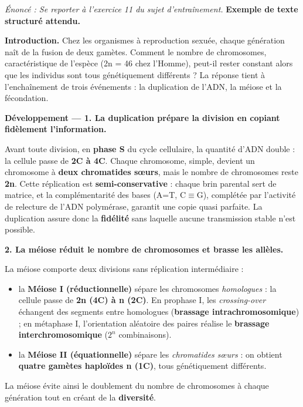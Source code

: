 \documentclass[11pt]{article}
\begin{document}
\begin{corrige}
\textit{Énoncé : Se reporter à l'exercice 11 du sujet d'entraînement.}
\tcblower
\textbf{Exemple de texte structuré attendu.}

\textbf{Introduction.} Chez les organismes à reproduction sexuée, chaque génération naît de la fusion de deux gamètes. Comment le nombre de chromosomes, caractéristique de l'espèce (2n = 46 chez l'Homme), peut-il rester constant alors que les individus sont tous génétiquement différents ? La réponse tient à l'enchaînement de trois événements : la duplication de l'ADN, la méiose et la fécondation.

\textbf{Développement — 1. La duplication prépare la division en copiant fidèlement l'information.}

Avant toute division, en \textbf{phase S} du cycle cellulaire, la quantité d'ADN double : la cellule passe de \textbf{2C à 4C}. Chaque chromosome, simple, devient un chromosome à \textbf{deux chromatides sœurs}, mais le nombre de chromosomes reste \textbf{2n}. Cette réplication est \textbf{semi-conservative} : chaque brin parental sert de matrice, et la complémentarité des bases (A=T, C$\equiv$G), complétée par l'activité de relecture de l'ADN polymérase, garantit une copie quasi parfaite. La duplication assure donc la \textbf{fidélité} sans laquelle aucune transmission stable n'est possible.

\textbf{2. La méiose réduit le nombre de chromosomes et brasse les allèles.}

La méiose comporte deux divisions sans réplication intermédiaire :
\begin{itemize}
    \item la \textbf{Méiose I (réductionnelle)} sépare les chromosomes \emph{homologues} : la cellule passe de \textbf{2n (4C) à n (2C)}. En prophase I, les \emph{crossing-over} échangent des segments entre homologues (\textbf{brassage intrachromosomique}) ; en métaphase I, l'orientation aléatoire des paires réalise le \textbf{brassage interchromosomique} ($2^n$ combinaisons).
    \item la \textbf{Méiose II (équationnelle)} sépare les \emph{chromatides sœurs} : on obtient \textbf{quatre gamètes haploïdes n (1C)}, tous génétiquement différents.
\end{itemize}
La méiose évite ainsi le doublement du nombre de chromosomes à chaque génération tout en créant de la \textbf{diversité}.


\end{corrige}
\end{document}
